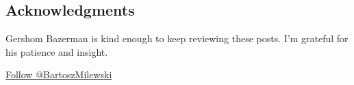\subsection{Acknowledgments}\label{acknowledgments}

Gershom Bazerman is kind enough to keep reviewing these posts. I'm
grateful for his patience and insight.


\href{https://twitter.com/BartoszMilewski}{Follow @BartoszMilewski}
